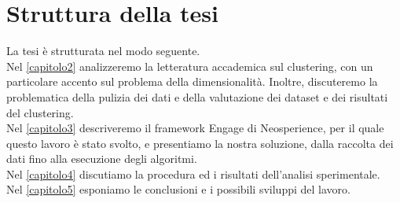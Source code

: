 \section{Struttura della tesi}
La tesi \`e strutturata nel modo seguente.\\
Nel \autoref{capitolo2} analizzeremo la letteratura accademica sul clustering, con un particolare accento sul problema della dimensionalit\`a. Inoltre, discuteremo la problematica della pulizia dei dati e della valutazione dei dataset e dei risultati del clustering.\\
Nel \autoref{capitolo3} descriveremo il framework Engage di Neosperience, per il quale questo lavoro \`e stato svolto, e presentiamo la nostra soluzione, dalla raccolta dei dati fino alla esecuzione degli algoritmi.\\
Nel \autoref{capitolo4} discutiamo la procedura ed i risultati dell'analisi sperimentale.\\
Nel \autoref{capitolo5} esponiamo le conclusioni e i possibili sviluppi del lavoro.\\
